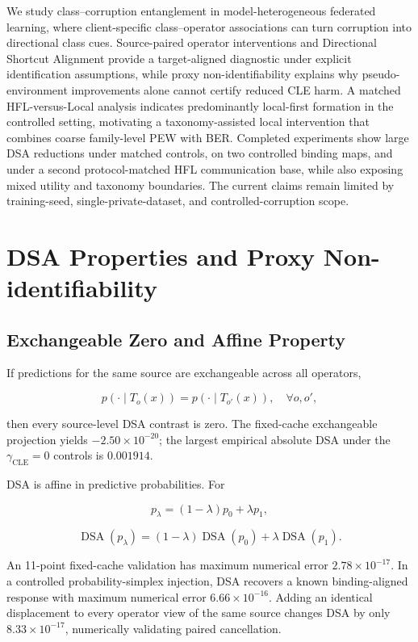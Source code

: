 \documentclass[10pt,twocolumn]{article}
\begin{document}
We study class--corruption entanglement in model-heterogeneous federated learning, where client-specific class--operator associations can turn corruption into directional class cues. Source-paired operator interventions and Directional Shortcut Alignment provide a target-aligned diagnostic under explicit identification assumptions, while proxy non-identifiability explains why pseudo-environment improvements alone cannot certify reduced CLE harm. A matched HFL-versus-Local analysis indicates predominantly local-first formation in the controlled setting, motivating a taxonomy-assisted local intervention that combines coarse family-level PEW with BER. Completed experiments show large DSA reductions under matched controls, on two controlled binding maps, and under a second protocol-matched HFL communication base, while also exposing mixed utility and taxonomy boundaries. The current claims remain limited by training-seed, single-private-dataset, and controlled-corruption scope.

\appendix
\section{DSA Properties and Proxy Non-identifiability}

\subsection{Exchangeable Zero and Affine Property}

If predictions for the same source are exchangeable across all operators,

\[
p(\cdot\mid T_o(x))=p(\cdot\mid T_{o'}(x)),\quad\forall o,o',
\]

then every source-level DSA contrast is zero. The fixed-cache exchangeable projection yields \(-2.50\times10^{-20}\); the largest empirical absolute DSA under the \(\gamma_{\mathrm{CLE}}=0\) controls is \(0.001914\).

DSA is affine in predictive probabilities. For

\[
p_\lambda=(1-\lambda)p_0+\lambda p_1,
\]

\[
\operatorname{DSA}(p_\lambda)
=(1-\lambda)\operatorname{DSA}(p_0)
+\lambda\operatorname{DSA}(p_1).
\]

An 11-point fixed-cache validation has maximum numerical error \(2.78\times10^{-17}\). In a controlled probability-simplex injection, DSA recovers a known binding-aligned response with maximum numerical error \(6.66\times10^{-16}\). Adding an identical displacement to every operator view of the same source changes DSA by only \(8.33\times10^{-17}\), numerically validating paired cancellation.
\end{document}
